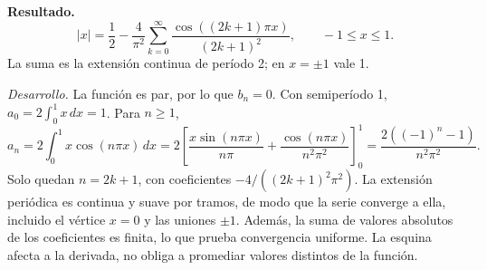 \noindent\textbf{Resultado.} \[|x|=\frac12-\frac4{\pi^2}\sum_{k=0}^{\infty}
\frac{\cos((2k+1)\pi x)}{(2k+1)^2},\qquad -1\le x\le1.\]
La suma es la extensión continua de período 2; en \(x=\pm1\) vale 1.

\noindent\textit{Desarrollo.} La función es par, por lo que \(b_n=0\). Con semiperíodo 1,
\(a_0=2\int_0^1x\,dx=1\). Para \(n\ge1\),
\[a_n=2\int_0^1x\cos(n\pi x)\,dx
=2\left[\frac{x\sin(n\pi x)}{n\pi}+\frac{\cos(n\pi x)}{n^2\pi^2}\right]_0^1
=\frac{2((-1)^n-1)}{n^2\pi^2}.\]
Solo quedan \(n=2k+1\), con coeficientes \(-4/((2k+1)^2\pi^2)\).
La extensión periódica es continua y suave por tramos, de modo que la serie converge
a ella, incluido el vértice \(x=0\) y las uniones \(\pm1\). Además, la suma de valores
absolutos de los coeficientes es finita, lo que prueba convergencia uniforme.
La esquina afecta a la derivada, no obliga a promediar valores distintos de la función.
